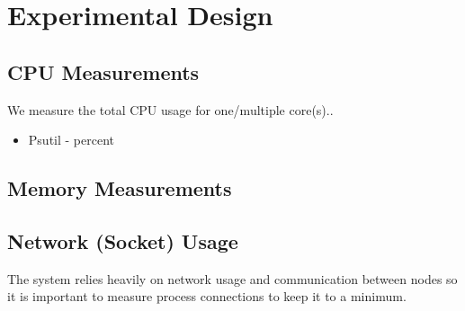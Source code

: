 \documentclass[USenglish]{uit-thesis}
\begin{document}
\section{Experimental Design}



\subsection{CPU Measurements}
We measure the total CPU usage for one/multiple core(s).. 

\begin{itemize}
\item Psutil - percent
\end{itemize}


\subsection{Memory Measurements}


\subsection{Network (Socket) Usage}
The system relies heavily on network usage and communication between nodes so it is important to measure process connections to keep it to a minimum.
\end{document}
